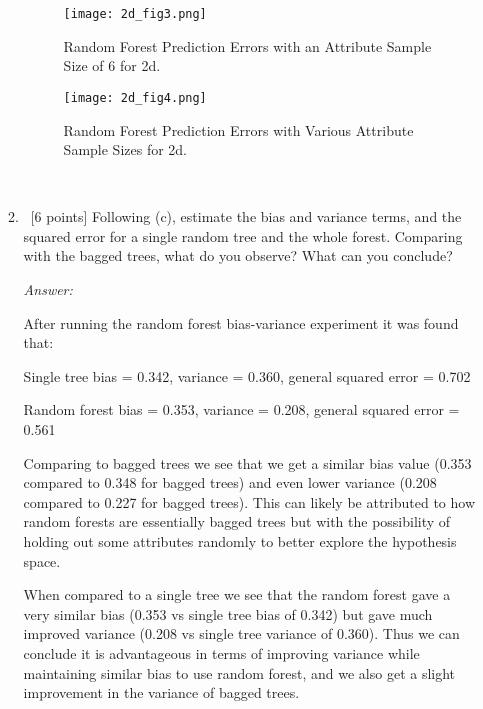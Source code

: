 \documentclass[12pt, fullpage,letterpaper]{article}
\begin{document}
\begin{enumerate}
\begin{enumerate}
	\begin{figure}[h]
	\begin{center}
	\texttt{[image: 2d\_fig3.png]}
	\end{center}
	\caption{Random Forest Prediction Errors with an Attribute Sample Size of 6 for 2d.}
	\label{fig:2d3}
	\end{figure}

	\begin{figure}[h]
	\begin{center}
	\texttt{[image: 2d\_fig4.png]}
	\end{center}
	\caption{Random Forest Prediction Errors with Various Attribute Sample Sizes for 2d.}
	\label{fig:2d4}
	\end{figure}

	\newpage
	~\newpage
	\item~[6 points] Following (c), estimate the bias and variance terms, and the squared error for a single random tree and the whole forest.  Comparing with the bagged trees, what do you observe? What can you conclude? 

	\textit{Answer:}

	After running the random forest bias-variance experiment it was found that: 

	Single tree bias = 0.342, variance = 0.360, general squared error = 0.702

	Random forest bias = 0.353, variance = 0.208, general squared error = 0.561

	Comparing to bagged trees we see that we get a similar bias value (0.353 compared to 0.348 for bagged trees) and even lower variance (0.208 compared to 0.227 for bagged trees). 
	This can likely be attributed to how random forests are essentially bagged trees but with the possibility of holding out some attributes randomly to better explore the hypothesis space.

	When compared to a single tree we see that the random forest gave a very similar bias (0.353 vs single tree bias of 0.342) but gave much improved variance (0.208 vs single tree variance of 0.360).
	Thus we can conclude it is advantageous in terms of improving variance while maintaining similar bias to use random forest, and we also get a slight improvement in the variance of bagged trees.

\end{enumerate}


\end{enumerate}
\end{document}
